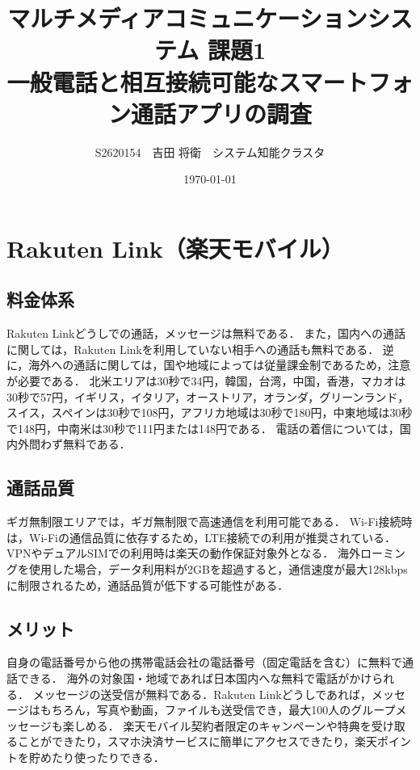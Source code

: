 \documentclass[a4paper,12pt]{article}
\title{マルチメディアコミュニケーションシステム 課題1\\
{\normalsize 一般電話と相互接続可能なスマートフォン通話アプリの調査}}
\author{S2620154　吉田 将衛　システム知能クラスタ}
\date{\today}
\begin{document}
\maketitle

\section{Rakuten Link（楽天モバイル）}\cite{rakuten-link-service}

\subsection{料金体系}

Rakuten Linkどうしでの通話，メッセージは無料である．
また，国内への通話に関しては，Rakuten Linkを利用していない相手への通話も無料である．
逆に，海外への通話に関しては，国や地域によっては従量課金制であるため，注意が必要である．
北米エリアは30秒で34円，韓国，台湾，中国，香港，マカオは30秒で57円，イギリス，イタリア，オーストリア，オランダ，グリーンランド，スイス，スペインは30秒で108円，アフリカ地域は30秒で180円，中東地域は30秒で148円，中南米は30秒で111円または148円である．
電話の着信については，国内外問わず無料である．

\subsection{通話品質}

ギガ無制限エリアでは，ギガ無制限で高速通信を利用可能である．
Wi-Fi接続時は，Wi-Fiの通信品質に依存するため，LTE接続での利用が推奨されている．
VPNやデュアルSIMでの利用時は楽天の動作保証対象外となる．
海外ローミングを使用した場合，データ利用料が2GBを超過すると，通信速度が最大128kbpsに制限されるため，通話品質が低下する可能性がある．

\subsection{メリット}

自身の電話番号から他の携帯電話会社の電話番号（固定電話を含む）に無料で通話できる．
海外の対象国・地域であれば日本国内へな無料で電話がかけられる．
メッセージの送受信が無料である．Rakuten Linkどうしであれば，メッセージはもちろん，写真や動画，ファイルも送受信でき，最大100人のグループメッセージも楽しめる．
楽天モバイル契約者限定のキャンペーンや特典を受け取ることができたり，スマホ決済サービスに簡単にアクセスできたり，楽天ポイントを貯めたり使ったりできる．
\end{document}
